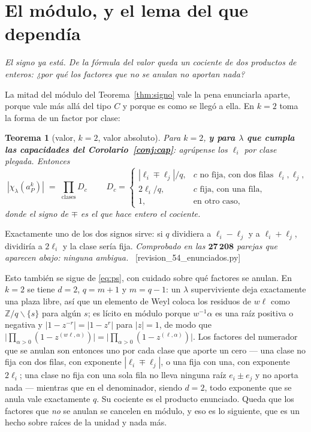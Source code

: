 \documentclass[11pt,a4paper]{article}
\newtheorem{theorem}{Teorema}[section]
\newcommand{\ver}[1]{\unskip\penalty0\ \textcolor{azul}{\small\textsf{[#1]}}}
\begin{document}
\section{El módulo, y el lema del que dependía}\label{sec:modulo}

\noindent\emph{El signo ya está. De la fórmula del valor queda un cociente de dos productos de enteros: ¿por qué los factores que \emph{no} se anulan no aportan nada?}

La mitad del módulo del Teorema~\ref{thm:signo} vale la pena enunciarla aparte, porque vale más
allá del tipo $C$ y porque es como se llegó a ella. En $k=2$ toma la forma de un factor por clase:

\begin{theorem}[valor, $k=2$, valor absoluto]\label{conj:val}
Para $k=2$, \textbf{y para $\lambda$ que cumpla las capacidades del Corolario~\ref{conj:cap}}:
agrúpense los $\ell_i$ por clase plegada. Entonces
\[
\boxed{\;|\chi_\lambda(a_P^k)| \;=\; \prod_{\text{clases}} D_c\;}
\qquad
D_c=\begin{cases}
|\ell_i\mp\ell_j|/q, & c \text{ no fija, con dos filas } \ell_i,\ell_j,\\[2pt]
2\ell_i/q, & c \text{ fija, con una fila},\\[2pt]
1, & \text{en otro caso,}
\end{cases}
\]
donde el signo de $\mp$ es el que hace entero el cociente.
\end{theorem}

\noindent Exactamente uno de los dos signos sirve: si $q$ dividiera a $\ell_i-\ell_j$ y a
$\ell_i+\ell_j$, dividiría a $2\ell_i$ y la clase sería fija. \emph{Comprobado en las
$\mathbf{27\,208}$ parejas que aparecen abajo: ninguna ambigua.}
\ver{revision\_54\_enunciados.py}

\noindent Esto también se sigue de \eqref{eq:ps}, con cuidado sobre qué factores se anulan. En $k=2$
se tiene $d=2$, $q=m+1$ y $m=q-1$: un $\lambda$ superviviente deja exactamente una plaza libre, así
que un elemento de Weyl coloca los residuos de $w\ell$ como $\mathbb{Z}/q\smallsetminus\{s\}$ para algún
$s$; es lícito en módulo porque $w^{-1}\alpha$ es una raíz positiva o negativa y
$|1-z^{-r}|=|1-z^{r}|$ para $|z|=1$, de modo que
$\big|\prod_{\alpha>0}(1-z^{(w\ell,\alpha)})\big|=\big|\prod_{\alpha>0}(1-z^{(\ell,\alpha)})\big|$.
Los factores del numerador que se anulan son entonces uno por cada clase que aporte un cero --- una
clase no fija con dos filas, con exponente $|\ell_i\mp\ell_j|$, o una fija con una, con exponente
$2\ell_i$; una clase no fija con una sola fila no lleva ninguna raíz $e_i\pm e_j$ y no aporta nada
--- mientras que en el denominador, siendo $d=2$, todo exponente que se anula vale exactamente
$q$. Su cociente es el producto enunciado. Queda
que los factores que \emph{no} se anulan se cancelen en módulo, y eso es lo siguiente, que es un
hecho sobre raíces de la unidad y nada más.
\end{document}
